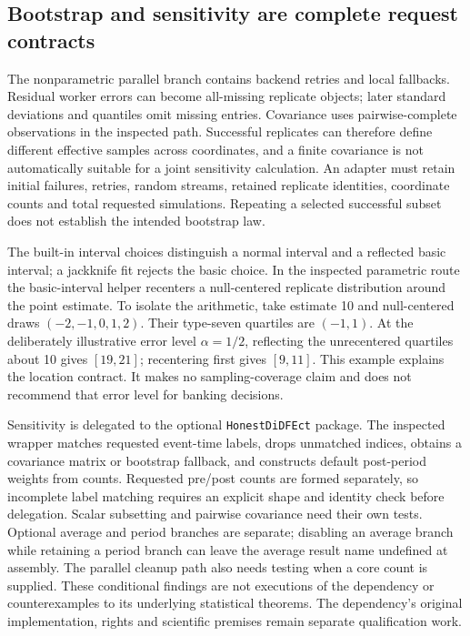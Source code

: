 \subsection{Bootstrap and sensitivity are complete request contracts}
The nonparametric parallel branch contains backend retries and local
fallbacks. Residual worker errors can become all-missing replicate objects;
later standard deviations and quantiles omit missing entries. Covariance
uses pairwise-complete observations in the inspected path. Successful
replicates can therefore define different effective samples across
coordinates, and a finite covariance is not automatically suitable for a
joint sensitivity calculation. An adapter must retain initial failures,
retries, random streams, retained replicate identities, coordinate counts
and total requested simulations. Repeating a selected successful subset
does not establish the intended bootstrap law.\citep{exec24_fect_source}

The built-in interval choices distinguish a normal interval and a reflected
basic interval; a jackknife fit rejects the basic choice. In the inspected
parametric route the basic-interval helper recenters a null-centered
replicate distribution around the point estimate. To isolate the arithmetic,
take estimate 10 and null-centered draws $(-2,-1,0,1,2)$. Their type-seven
quartiles are $(-1,1)$. At the deliberately illustrative error level
$\alpha=1/2$, reflecting the unrecentered quartiles about 10 gives
$[19,21]$; recentering first gives $[9,11]$. This example explains the
location contract. It makes no sampling-coverage claim and does not
recommend that error level for banking decisions.
\citep{exec24_fect_source,exec24_fect_choice}

Sensitivity is delegated to the optional \texttt{HonestDiDFEct} package.
The inspected wrapper matches requested event-time labels, drops unmatched
indices, obtains a covariance matrix or bootstrap fallback, and constructs
default post-period weights from counts. Requested pre/post counts are
formed separately, so incomplete label matching requires an explicit
shape and identity check before delegation. Scalar subsetting and
pairwise covariance need their own tests. Optional average and period
branches are separate; disabling an average branch while retaining a
period branch can leave the average result name undefined at assembly.
The parallel cleanup path also needs testing when a core count is supplied.
These conditional findings are not executions of the dependency or
counterexamples to its underlying statistical theorems. The dependency's
original implementation, rights and scientific premises remain separate
qualification work.\citep{exec24_fect_source,exec24_fect_choice}

